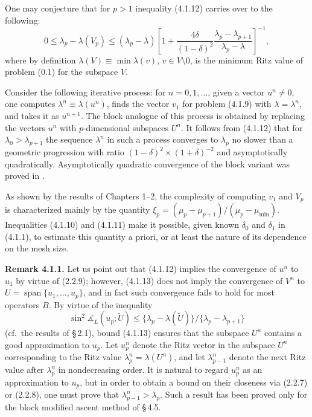\documentclass[11pt,oneside]{book}
\newcommand{\myspan}{\operatorname{span}}
\newcommand{\ang}{\measuredangle}
\begin{document}
One may conjecture that for $p > 1$ inequality (4.1.12) carries over to the following:
\[
0 \leqslant \lambda_p - \lambda(V_p) \leqslant (\lambda_p - \lambda) \left[ 1 + \frac{4\delta}{(1 - \delta)^2} \frac{\lambda_p - \lambda_{p+1}}{\lambda_p - \lambda} \right]^{-1}, \tag{4.1.13}
\]
where by definition $\lambda(V) \equiv \min \lambda(v)$, $v \in V \setminus 0$, is the minimum Ritz value of problem (0.1) for the subspace $V$.

Consider the following iterative process: for $n = 0, 1, \ldots$, given a vector $u^n \neq 0$, one computes $\lambda^n \equiv \lambda(u^n)$, finds the vector $v_1$ for problem (4.1.9) with $\lambda = \lambda^n$, and takes it as $u^{n+1}$. The block analogue of this process is obtained by replacing the vectors $u^n$ with $p$-dimensional subspaces $U^n$. It follows from (4.1.12) that for $\lambda_0 > \lambda_{p+1}$ the sequence $\lambda^n$ in such a process converges to $\lambda_p$ no slower than a geometric progression with ratio $(1 - \delta)^2 \times (1 + \delta)^{-2}$ and asymptotically quadratically. Asymptotically quadratic convergence of the block variant was proved in \citep{Zhihao1983}. %

As shown by the results of Chapters 1--2, the complexity of computing $v_1$ and $V_p$ is characterized mainly by the quantity $\xi_p = (\mu_p - \mu_{p+1}) / (\mu_p - \mu_{\min})$. Inequalities (4.1.10) and (4.1.11) make it possible, given known $\delta_0$ and $\delta_1$ in (4.1.1), to estimate this quantity a priori, or at least the nature of its dependence on the mesh size.

\textbf{Remark 4.1.1.} Let us point out that (4.1.12) implies the convergence of $u^n$ to $u_1$ by virtue of (2.2.9); however, (4.1.13) does not imply the convergence of $V^n$ to $U = \myspan\{u_1, \ldots, u_p\}$, and in fact such convergence fails to hold for %
most operators $B$. By virtue of the inequality
\[
\sin^2 \ang_L (u_p; \widetilde{U}) \leqslant \{ \lambda_p - \lambda(\widetilde{U}) \} / \{ \lambda_p - \lambda_{p+1} \} \tag{4.1.14}
\]
(cf.\ the results of \S\,2.1), bound (4.1.13) ensures that the subspace $U^n$ contains a good approximation to $u_p$. Let $u_p^n$ denote the Ritz vector in the subspace $U^n$ corresponding to the Ritz value $\lambda_p^n = \lambda(U^n)$, and let $\lambda_{p-1}^n$ denote the next Ritz value after $\lambda_p^n$ in nondecreasing order. It is natural to regard $u_p^n$ as an approximation to $u_p$, but in order to obtain a bound on their closeness via (2.2.7) or (2.2.8), one must prove that $\lambda_{p-1}^n > \lambda_p$. Such a result has been proved only for the block modified ascent method of \S\,4.5.
\end{document}
